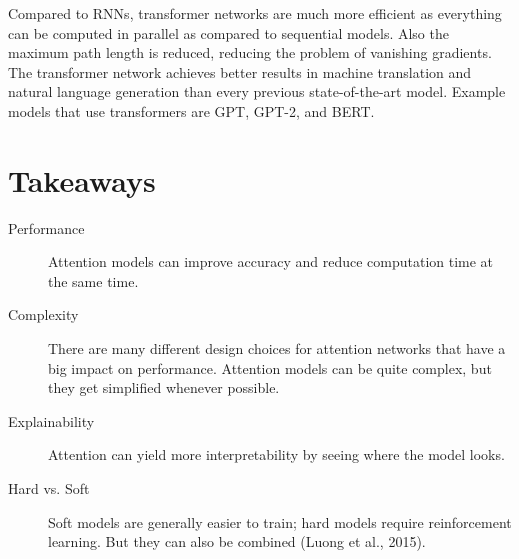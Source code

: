 		Compared to RNNs, transformer networks are much more efficient as everything can be computed in parallel as compared to sequential models. Also the maximum path length is reduced, reducing the problem of vanishing gradients. The transformer network achieves better results in machine translation and natural language generation than every previous state-of-the-art model. Example models that use transformers are GPT, GPT-2, and BERT.

	\section{Takeaways}
		\begin{description}
			\item[Performance]    Attention models can improve accuracy and reduce computation time at the same time.
			\item[Complexity]     There are many different design choices for attention networks that have a big impact on performance. Attention models can be quite complex, but they get simplified whenever possible.
			\item[Explainability] Attention can yield more interpretability by seeing where the model looks.
			\item[Hard vs. Soft]  Soft models are generally easier to train; hard models require reinforcement learning. But they can also be combined (Luong et al., 2015).
		\end{description}
